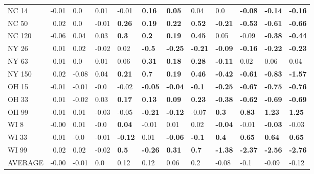 \begin{tabular}{lrllllllllll}
NC 14   &    -0.01 &             0.0 &            0.01 &           -0.01 &           \textbf{0.16} &   \textbf{0.05} &            0.04 &             0.0 &  \textbf{-0.08} &  \textbf{-0.14} &  \textbf{-0.16} \\
NC 50   &     0.02 &             0.0 &           -0.01 &   \textbf{0.26} &           \textbf{0.19} &   \textbf{0.22} &   \textbf{0.52} &  \textbf{-0.21} &  \textbf{-0.53} &  \textbf{-0.61} &  \textbf{-0.66} \\
NC 120  &    -0.06 &            0.04 &            0.03 &    \textbf{0.3} &            \textbf{0.2} &   \textbf{0.19} &   \textbf{0.45} &            0.05 &           -0.09 &  \textbf{-0.38} &  \textbf{-0.44} \\
NY 26   &     0.01 &            0.02 &           -0.02 &            0.02 &           \textbf{-0.5} &  \textbf{-0.25} &  \textbf{-0.21} &  \textbf{-0.09} &  \textbf{-0.16} &  \textbf{-0.22} &  \textbf{-0.23} \\
NY 63   &     0.01 &             0.0 &            0.01 &            0.06 &           \textbf{0.31} &   \textbf{0.18} &   \textbf{0.28} &  \textbf{-0.11} &            0.02 &            0.06 &            0.04 \\
NY 150  &     0.02 &           -0.08 &            0.04 &   \textbf{0.21} &            \textbf{0.7} &   \textbf{0.19} &   \textbf{0.46} &  \textbf{-0.42} &  \textbf{-0.61} &  \textbf{-0.83} &  \textbf{-1.57} \\
OH 15   &    -0.01 &           -0.01 &            -0.0 &           -0.02 &          \textbf{-0.05} &  \textbf{-0.04} &   \textbf{-0.1} &  \textbf{-0.25} &  \textbf{-0.67} &  \textbf{-0.75} &  \textbf{-0.76} \\
OH 33   &     0.01 &           -0.02 &            0.03 &   \textbf{0.17} &           \textbf{0.13} &   \textbf{0.09} &   \textbf{0.23} &  \textbf{-0.38} &  \textbf{-0.62} &  \textbf{-0.69} &  \textbf{-0.69} \\
OH 99   &    -0.01 &            0.01 &           -0.03 &           -0.05 &          \textbf{-0.21} &  \textbf{-0.12} &           -0.07 &    \textbf{0.3} &   \textbf{0.83} &   \textbf{1.23} &   \textbf{1.25} \\
WI 8    &    -0.00 &            0.01 &            -0.0 &   \textbf{0.04} &                   -0.01 &            0.01 &            0.02 &  \textbf{-0.04} &           -0.01 &  \textbf{-0.03} &           -0.03 \\
WI 33   &    -0.01 &            -0.0 &           -0.01 &  \textbf{-0.12} &                    0.01 &  \textbf{-0.06} &   \textbf{-0.1} &    \textbf{0.4} &   \textbf{0.65} &   \textbf{0.64} &   \textbf{0.65} \\
WI 99   &     0.02 &            0.02 &           -0.02 &    \textbf{0.5} &          \textbf{-0.26} &   \textbf{0.31} &    \textbf{0.7} &  \textbf{-1.38} &  \textbf{-2.37} &  \textbf{-2.56} &  \textbf{-2.76} \\
AVERAGE &    -0.00 &           -0.01 &             0.0 &            0.12 &                    0.12 &            0.06 &             0.2 &           -0.08 &            -0.1 &           -0.09 &           -0.12 \\
\bottomrule
\end{tabular}
